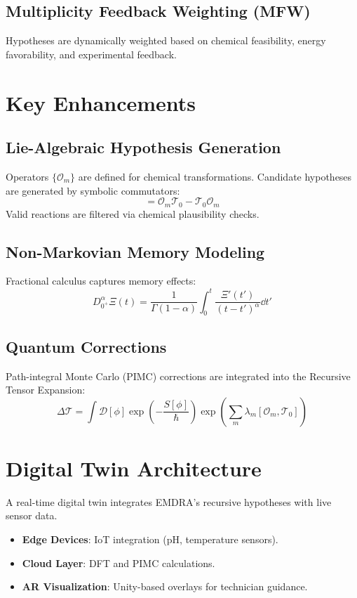 \documentclass[12pt]{article}
\begin{document}
\subsection{Multiplicity Feedback Weighting (MFW)}
Hypotheses are dynamically weighted based on chemical feasibility, energy favorability, and experimental feedback.

\section{Key Enhancements}
\subsection{Lie-Algebraic Hypothesis Generation}
Operators $\{ \mathcal{O}_m \}$ are defined for chemical transformations. Candidate hypotheses are generated by symbolic commutators:
\begin{equation}
[ \mathcal{O}_m, \mathcal{T}_0 ] = \mathcal{O}_m \mathcal{T}_0 - \mathcal{T}_0 \mathcal{O}_m
\end{equation}
Valid reactions are filtered via chemical plausibility checks.

\subsection{Non-Markovian Memory Modeling}
Fractional calculus captures memory effects:
\begin{equation}
D^\alpha_{0^+} \Xi(t) = \frac{1}{\Gamma(1-\alpha)} \int_0^t \frac{\Xi'(t')}{(t-t')^\alpha} \dd t'
\end{equation}

\subsection{Quantum Corrections}
Path-integral Monte Carlo (PIMC) corrections are integrated into the Recursive Tensor Expansion:
\begin{equation}
\Delta \mathcal{T} = \int \mathcal{D}[\phi] \exp\left( -\frac{S[\phi]}{\hbar} \right) \exp\left( \sum_m \lambda_m [\mathcal{O}_m, \mathcal{T}_0] \right)
\end{equation}

\section{Digital Twin Architecture}
A real-time digital twin integrates EMDRA's recursive hypotheses with live sensor data.
\begin{itemize}
    \item \textbf{Edge Devices}: IoT integration (pH, temperature sensors).
    \item \textbf{Cloud Layer}: DFT and PIMC calculations.
    \item \textbf{AR Visualization}: Unity-based overlays for technician guidance.
\end{itemize}
\end{document}
